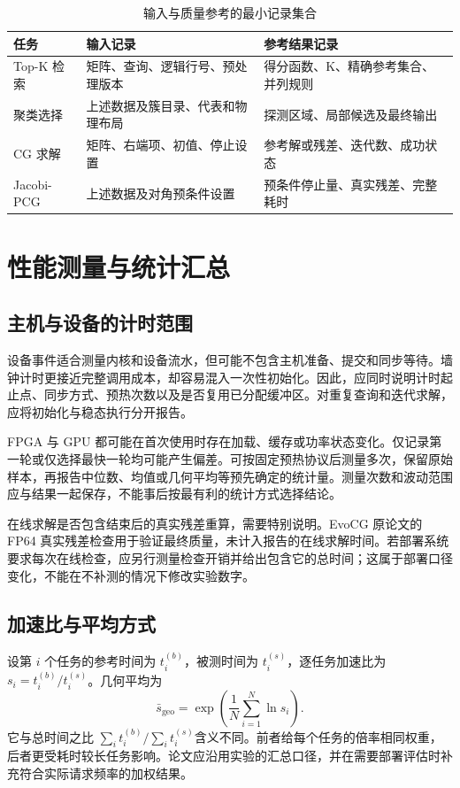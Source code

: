 \begin{table}[htbp]\centering\caption{输入与质量参考的最小记录集合}
\begin{tabularx}{\textwidth}{p{2.6cm}XX}\toprule
任务&输入记录&参考结果记录\\\midrule
Top-K 检索&矩阵、查询、逻辑行号、预处理版本&得分函数、K、精确参考集合、并列规则\\
聚类选择&上述数据及簇目录、代表和物理布局&探测区域、局部候选及最终输出\\
CG 求解&矩阵、右端项、初值、停止设置&参考解或残差、迭代数、成功状态\\
Jacobi-PCG&上述数据及对角预条件设置&预条件停止量、真实残差、完整耗时\\\bottomrule
\end{tabularx}\end{table}

\section{性能测量与统计汇总}
\subsection{主机与设备的计时范围}
设备事件适合测量内核和设备流水，但可能不包含主机准备、提交和同步等待。墙钟计时更接近完整调用成本，却容易混入一次性初始化。因此，应同时说明计时起止点、同步方式、预热次数以及是否复用已分配缓冲区。对重复查询和迭代求解，应将初始化与稳态执行分开报告。

FPGA 与 GPU 都可能在首次使用时存在加载、缓存或功率状态变化。仅记录第一轮或仅选择最快一轮均可能产生偏差。可按固定预热协议后测量多次，保留原始样本，再报告中位数、均值或几何平均等预先确定的统计量。测量次数和波动范围应与结果一起保存，不能事后按最有利的统计方式选择结论。

在线求解是否包含结束后的真实残差重算，需要特别说明。EvoCG 原论文的 FP64 真实残差检查用于验证最终质量，未计入报告的在线求解时间。若部署系统要求每次在线检查，应另行测量检查开销并给出包含它的总时间；这属于部署口径变化，不能在不补测的情况下修改实验数字。

\subsection{加速比与平均方式}
设第 $i$ 个任务的参考时间为 $t_i^{(b)}$，被测时间为 $t_i^{(s)}$，逐任务加速比为 $s_i=t_i^{(b)}/t_i^{(s)}$。几何平均为
\begin{equation}
 \bar s_{\mathrm{geo}}=\exp\left(\frac1N\sum_{i=1}^N\ln s_i\right).
\end{equation}
它与总时间之比 $\sum_i t_i^{(b)}/\sum_i t_i^{(s)}$含义不同。前者给每个任务的倍率相同权重，后者更受耗时较长任务影响。论文应沿用实验的汇总口径，并在需要部署评估时补充符合实际请求频率的加权结果。

